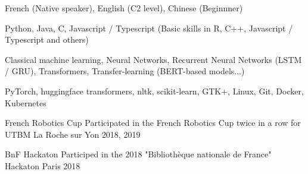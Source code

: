 \documentclass[11pt, a4paper]{awesome-cv}
\begin{document}

\begin{cvskills}
  {French (Native speaker), English (C2 level), Chinese (Beginnner)}
  
  {Python, Java, C, Javascript / Typescript (Basic skills in R, C++, Javascript / Typescript and others)}

  {Classical machine learning, Neural Networks, Recurrent Neural Networks (LSTM / GRU), Transformers, Transfer-learning (BERT-based models...)}

  {PyTorch, huggingface transformers, nltk, scikit-learn, GTK+, Linux, Git, Docker, Kubernetes}
\end{cvskills}



\begin{cvhonors}
  \cvhonor
  {French Robotics Cup}
  {Participated in the French Robotics Cup twice in a row for UTBM}
  {La Roche sur Yon}
  {2018, 2019}

  \cvhonor
  {BnF Hackaton}
  {Participed in the 2018 "Bibliothèque nationale de France" Hackaton}
  {Paris}
  {2018}
\end{cvhonors}


\end{document}
